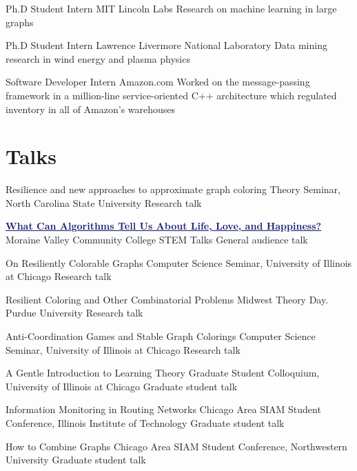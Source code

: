 \documentclass[11pt]{moderncv}
\begin{document}
         {Ph.D Student Intern}
      {MIT Lincoln Labs}
      {}
      {}
      {Research on machine learning in large graphs}

         {Ph.D Student Intern}
      {Lawrence Livermore National Laboratory}
      {}
      {}
      {Data mining research in wind energy and plasma physics}

         {Software Developer Intern}
      {Amazon.com}
      {}
      {}
      {Worked on the message-passing framework in a million-line service-oriented C++ architecture which regulated inventory in all of Amazon's warehouses}


   \section{Talks}
         {Resilience and new approaches to approximate graph coloring}
      {Theory Seminar, North Carolina State University}
      {Research talk}
      {}
{}

         {\href{https://www.youtube.com/watch?v=JH4DOjYX59Y}{\textcolor{MidnightBlue}{\underline{\textbf{What Can Algorithms Tell Us About Life, Love, and Happiness?}}}}}
      {Moraine Valley Community College STEM Talks}
      {General audience talk}
      {}
{}

         {On Resiliently Colorable Graphs}
      {Computer Science Seminar, University of Illinois at Chicago}
      {Research talk}
      {}
{}

         {Resilient Coloring and Other Combinatorial Problems}
      {Midwest Theory Day. Purdue University}
      {Research talk}
      {}
{}

         {Anti-Coordination Games and Stable Graph Colorings}
      {Computer Science Seminar, University of Illinois at Chicago}
      {Research talk}
      {}
{}

         {A Gentle Introduction to Learning Theory}
      {Graduate Student Colloquium, University of Illinois at Chicago}
      {Graduate student talk}
      {}
{}

         {Information Monitoring in Routing Networks}
      {Chicago Area SIAM Student Conference, Illinois Institute of Technology}
      {Graduate student talk}
      {}
{}

         {How to Combine Graphs}
      {Chicago Area SIAM Student Conference, Northwestern University}
      {Graduate student talk}
      {}
{}
\end{document}
